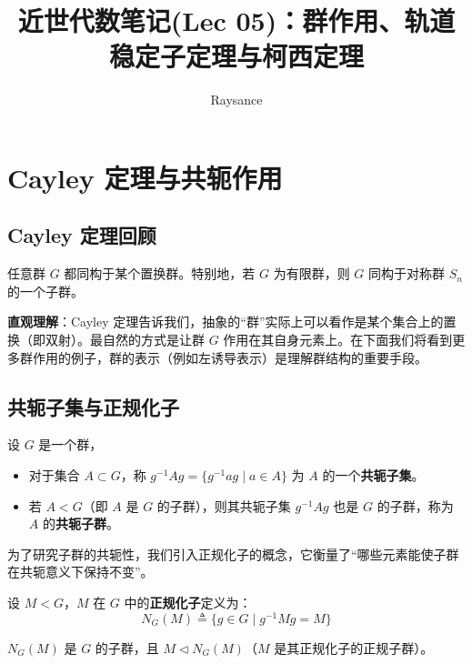 \documentclass[11pt]{article}
\title{近世代数笔记(Lec 05)：群作用、轨道稳定子定理与柯西定理}
\author{Raysance}
\date{}
\begin{document}
\maketitle

\section{Cayley 定理与共轭作用}

\subsection{Cayley 定理回顾}

\begin{cntheorem}[Cayley 定理]
    任意群 $G$ 都同构于某个置换群。特别地，若 $G$ 为有限群，则 $G$ 同构于对称群 $S_n$ 的一个子群。
\end{cntheorem}

\textbf{直观理解}：Cayley 定理告诉我们，抽象的“群”实际上可以看作是某个集合上的置换（即双射）。最自然的方式是让群 $G$ 作用在其自身元素上。在下面我们将看到更多群作用的例子，群的表示（例如左诱导表示）是理解群结构的重要手段。

\subsection{共轭子集与正规化子}

\begin{cndefinition}[共轭子集与共轭子群]
    设 $G$ 是一个群，
    \begin{itemize}
        \item 对于集合 $A \subset G$，称 $g^{-1}Ag = \{g^{-1}ag \mid a \in A\}$ 为 $A$ 的一个\textbf{共轭子集}。
        \item 若 $A < G$（即 $A$ 是 $G$ 的子群），则其共轭子集 $g^{-1}Ag$ 也是 $G$ 的子群，称为 $A$ 的\textbf{共轭子群}。
    \end{itemize}
\end{cndefinition}

为了研究子群的共轭性，我们引入正规化子的概念，它衡量了“哪些元素能使子群在共轭意义下保持不变”。

\begin{cndefinition}[正规化子]
    设 $M < G$，$M$ 在 $G$ 中的\textbf{正规化子}定义为：
    \[
    N_G(M) \triangleq \{g \in G \mid g^{-1}Mg = M\}
    \]
\end{cndefinition}

\begin{cnproperty}
    $N_G(M)$ 是 $G$ 的子群，且 $M \triangleleft N_G(M)$（$M$ 是其正规化子的正规子群）。
\end{cnproperty}
\end{document}
